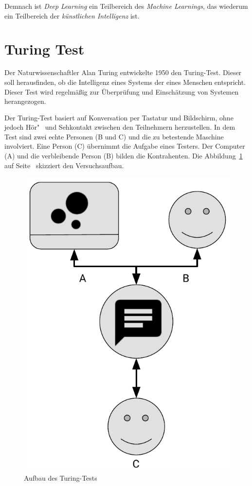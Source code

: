 Demnach ist \textit{Deep Learning} ein Teilbereich des \textit{Machine Learnings}, das wiederum ein Teilbereich der
\textit{künstlichen Intelligenz} ist.

\section{Turing Test}
Der Naturwissenschaftler Alan Turing entwickelte 1950 den Turing-Test. Dieser soll herausfinden, ob die Intelligenz
eines Systems der eines Menschen entspricht. Dieser Test wird regelmäßig zur Überprüfung und Einschätzung von Systemen
herangezogen.

Der Turing-Test basiert auf Konversation per Tastatur und Bildschirm, ohne jedoch Hör"~ und Sehkontakt zwischen den
Teilnehmern herzustellen. In dem Test sind zwei echte Personen (B und C) und die zu betestende Maschine involviert. Eine
Person (C) übernimmt die Aufgabe eines Testers. Der Computer (A) und die verbleibende Person (B) bilden die
Kontrahenten. Die Abbildung~\ref{fig:grundlagen_turingtest} auf Seite~\pageref{fig:grundlagen_turingtest} skizziert den
Versuchsaufbau.

\begin{figure}[h]
    \centering
    \includegraphics[scale=0.6]{images/kapitel_2/turing_test.pdf}
    \caption{Aufbau des Turing-Tests}
    \label{fig:grundlagen_turingtest}
\end{figure}

